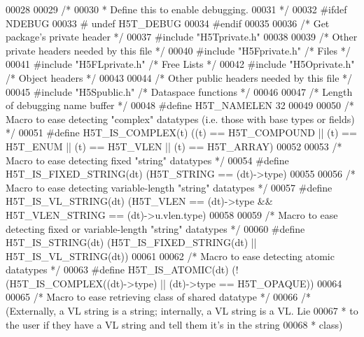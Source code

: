 \begin{DoxyCode}
00028 
00029 \textcolor{comment}{/*}
00030 \textcolor{comment}{ * Define this to enable debugging.}
00031 \textcolor{comment}{ */}
00032 \textcolor{preprocessor}{#ifdef NDEBUG}
00033 \textcolor{preprocessor}{#  undef H5T\_DEBUG}
00034 \textcolor{preprocessor}{#endif}
00035 
00036 \textcolor{comment}{/* Get package's private header */}
00037 \textcolor{preprocessor}{#include "H5Tprivate.h"}
00038 
00039 \textcolor{comment}{/* Other private headers needed by this file */}
00040 \textcolor{preprocessor}{#include "H5Fprivate.h"}     \textcolor{comment}{/* Files                */}
00041 \textcolor{preprocessor}{#include "H5FLprivate.h"}    \textcolor{comment}{/* Free Lists               */}
00042 \textcolor{preprocessor}{#include "H5Oprivate.h"}     \textcolor{comment}{/* Object headers           */}
00043 
00044 \textcolor{comment}{/* Other public headers needed by this file */}
00045 \textcolor{preprocessor}{#include "H5Spublic.h"}      \textcolor{comment}{/* Dataspace functions          */}
00046 
00047 \textcolor{comment}{/* Length of debugging name buffer */}
00048 \textcolor{preprocessor}{#define H5T\_NAMELEN     32}
00049 
00050 \textcolor{comment}{/* Macro to ease detecting "complex" datatypes (i.e. those with base types or fields) */}
00051 \textcolor{preprocessor}{#define H5T\_IS\_COMPLEX(t)       ((t) == H5T\_COMPOUND || (t) == H5T\_ENUM || (t) == H5T\_VLEN || (t) ==
       H5T\_ARRAY)}
00052 
00053 \textcolor{comment}{/* Macro to ease detecting fixed "string" datatypes */}
00054 \textcolor{preprocessor}{#define H5T\_IS\_FIXED\_STRING(dt) (H5T\_STRING == (dt)->type)}
00055 
00056 \textcolor{comment}{/* Macro to ease detecting variable-length "string" datatypes */}
00057 \textcolor{preprocessor}{#define H5T\_IS\_VL\_STRING(dt)    (H5T\_VLEN == (dt)->type && H5T\_VLEN\_STRING == (dt)->u.vlen.type)}
00058 
00059 \textcolor{comment}{/* Macro to ease detecting fixed or variable-length "string" datatypes */}
00060 \textcolor{preprocessor}{#define H5T\_IS\_STRING(dt)       (H5T\_IS\_FIXED\_STRING(dt) || H5T\_IS\_VL\_STRING(dt))}
00061 
00062 \textcolor{comment}{/* Macro to ease detecting atomic datatypes */}
00063 \textcolor{preprocessor}{#define H5T\_IS\_ATOMIC(dt)       (!(H5T\_IS\_COMPLEX((dt)->type) || (dt)->type == H5T\_OPAQUE))}
00064 
00065 \textcolor{comment}{/* Macro to ease retrieving class of shared datatype */}
00066 \textcolor{comment}{/* (Externally, a VL string is a string; internally, a VL string is a VL.  Lie}
00067 \textcolor{comment}{ *      to the user if they have a VL string and tell them it's in the string}
00068 \textcolor{comment}{ *      class)}

\end{DoxyCode}
